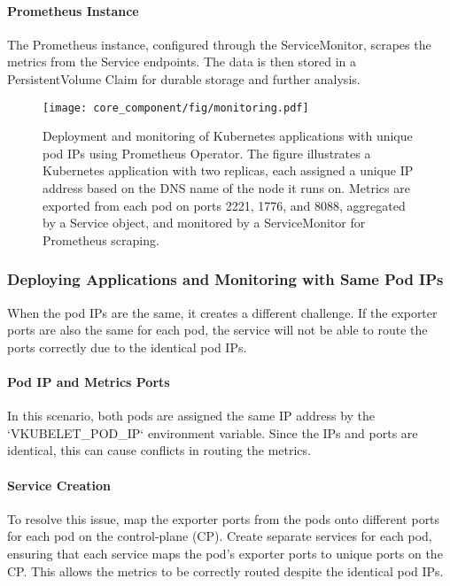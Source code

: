 \paragraph{Prometheus Instance}
The Prometheus instance, configured through the ServiceMonitor, scrapes the metrics from the Service endpoints. The data is then stored in a PersistentVolume Claim for durable storage and further analysis.

\begin{figure}[htbp]
\centering
\texttt{[image: core\_component/fig/monitoring.pdf]}
\caption{Deployment and monitoring of Kubernetes applications with unique pod IPs using Prometheus Operator. The figure illustrates a Kubernetes application with two replicas, each assigned a unique IP address based on the DNS name of the node it runs on. Metrics are exported from each pod on ports 2221, 1776, and 8088, aggregated by a Service object, and monitored by a ServiceMonitor for Prometheus scraping.}
\label{fig:unique-pod-ips}
\end{figure}

\subsubsection{Deploying Applications and Monitoring with Same Pod IPs}

When the pod IPs are the same, it creates a different challenge. If the exporter ports are also the same for each pod, the service will not be able to route the ports correctly due to the identical pod IPs.

\paragraph{Pod IP and Metrics Ports}
In this scenario, both pods are assigned the same IP address by the `VKUBELET\_POD\_IP` environment variable. Since the IPs and ports are identical, this can cause conflicts in routing the metrics.

\paragraph{Service Creation}
To resolve this issue, map the exporter ports from the pods onto different ports for each pod on the control-plane (CP). Create separate services for each pod, ensuring that each service maps the pod's exporter ports to unique ports on the CP. This allows the metrics to be correctly routed despite the identical pod IPs.

